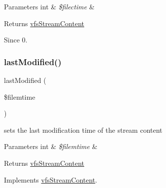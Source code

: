 \begin{DoxyParams}[1]{Parameters}
int & {\em \$filectime} & \\
\hline
\end{DoxyParams}
\begin{DoxyReturn}{Returns}
\mbox{\hyperlink{interfaceorg_1_1bovigo_1_1vfs_1_1vfs_stream_content}{vfs\+Stream\+Content}} 
\end{DoxyReturn}
\begin{DoxySince}{Since}
0. 
\end{DoxySince}
\mbox{\label{classorg_1_1bovigo_1_1vfs_1_1vfs_stream_abstract_content_ae862e04a845949a0d2bf4cada6a06ac4}} 
\subsubsection{\texorpdfstring{last\+Modified()}{lastModified()}}
{\footnotesize\ttfamily last\+Modified (\begin{DoxyParamCaption}\item[{}]{\$filemtime }\end{DoxyParamCaption})}

sets the last modification time of the stream content


\begin{DoxyParams}[1]{Parameters}
int & {\em \$filemtime} & \\
\hline
\end{DoxyParams}
\begin{DoxyReturn}{Returns}
\mbox{\hyperlink{interfaceorg_1_1bovigo_1_1vfs_1_1vfs_stream_content}{vfs\+Stream\+Content}} 
\end{DoxyReturn}


Implements \mbox{\hyperlink{interfaceorg_1_1bovigo_1_1vfs_1_1vfs_stream_content_ae862e04a845949a0d2bf4cada6a06ac4}{vfs\+Stream\+Content}}.

\mbox{\label{classorg_1_1bovigo_1_1vfs_1_1vfs_stream_abstract_content_ab40397a8b5cf98ff82734ce7b1276363}} 
